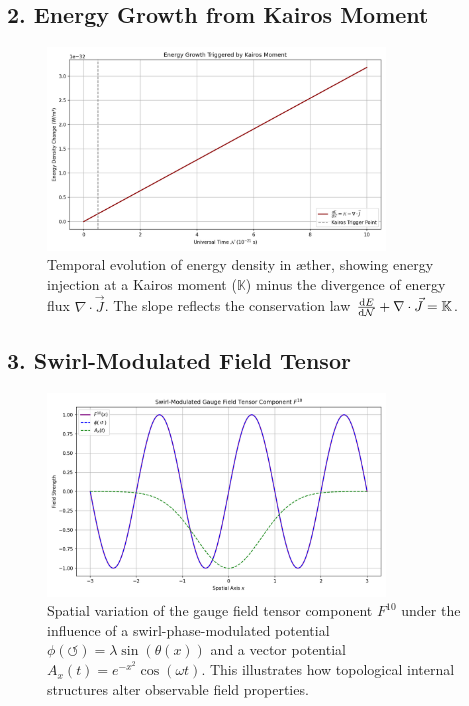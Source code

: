 \subsection*{2. Energy Growth from Kairos Moment}
\begin{figure}[H]
    \centering
    \includegraphics[width=0.8\textwidth]{images/SwirlClockInterference2}
    \caption{Temporal evolution of energy density in æther, showing energy injection at a Kairos moment ($\mathbb{K}$) minus the divergence of energy flux $\nabla \cdot \vec{J}$. The slope reflects the conservation law $\dv{E}{\mathcal{N}} + \nabla \cdot \vec{J} = \mathbb{K}$.}
    \label{fig:kairos_energy}
\end{figure}

\subsection*{3. Swirl-Modulated Field Tensor}
\begin{figure}[H]
    \centering
    \includegraphics[width=0.8\textwidth]{images/SwirlClockInterference3}
    \caption{Spatial variation of the gauge field tensor component $F^{1 0}$ under the influence of a swirl-phase-modulated potential $\phi(\circlearrowleft) = \lambda \sin(\theta(x))$ and a vector potential $A_x(t) = e^{-x^2} \cos(\omega t)$. This illustrates how topological internal structures alter observable field properties.}
    \label{fig:swirl_tensor}
\end{figure}

